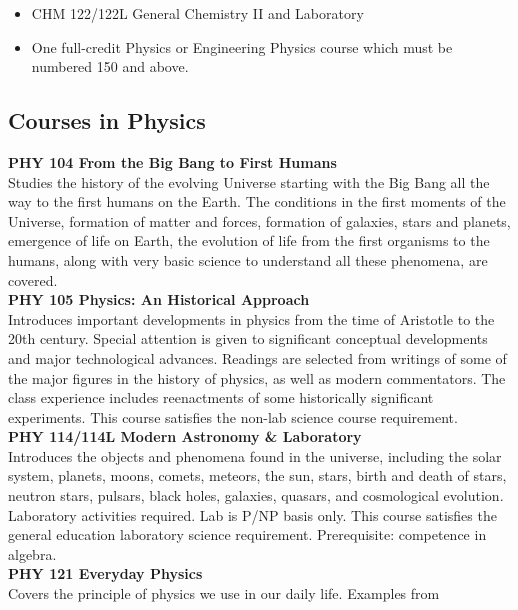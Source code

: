 \documentclass[
  letterpaper,
]{scrbook}
\providecommand{\tightlist}{%
  \setlength{\itemsep}{0pt}\setlength{\parskip}{0pt}}
\begin{document}
\begin{enumerate}
  \begin{itemize}
  \tightlist
  \item
    CHM 122/122L General Chemistry II and Laboratory\\
  \item
    One full-credit Physics or Engineering Physics course which must be
    numbered 150 and above.
  \end{itemize}
\end{enumerate}

\subsection{Courses in Physics}\label{courses-in-physics}

\textbf{PHY 104 From the Big Bang to First Humans}\\
Studies the history of the evolving Universe starting with the Big Bang
all the way to the first humans on the Earth. The conditions in the
first moments of the Universe, formation of matter and forces, formation
of galaxies, stars and planets, emergence of life on Earth, the
evolution of life from the first organisms to the humans, along with
very basic science to understand all these phenomena, are covered.\\
\textbf{PHY 105 Physics: An Historical Approach}\\
Introduces important developments in physics from the time of Aristotle
to the 20th century. Special attention is given to significant
conceptual developments and major technological advances. Readings are
selected from writings of some of the major figures in the history of
physics, as well as modern commentators. The class experience includes
reenactments of some historically significant experiments. This course
satisfies the non-lab science course requirement.\\
\textbf{PHY 114/114L Modern Astronomy \& Laboratory}\\
Introduces the objects and phenomena found in the universe, including
the solar system, planets, moons, comets, meteors, the sun, stars, birth
and death of stars, neutron stars, pulsars, black holes, galaxies,
quasars, and cosmological evolution. Laboratory activities required. Lab
is P/NP basis only. This course satisfies the general education
laboratory science requirement. Prerequisite: competence in algebra.\\
\textbf{PHY 121 Everyday Physics}\\
Covers the principle of physics we use in our daily life. Examples from
\end{document}
